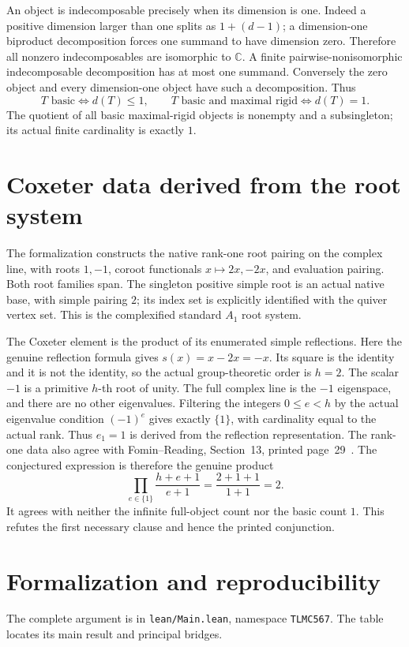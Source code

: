 \documentclass[11pt,a4paper]{article}
\newcommand{\C}{\mathbb C}
\begin{document}
An object is indecomposable precisely when its dimension is one. Indeed a
positive dimension larger than one splits as $1+(d-1)$; a dimension-one
biproduct decomposition forces one summand to have dimension zero.
Therefore all nonzero indecomposables are isomorphic to $\C$. A finite
pairwise-nonisomorphic indecomposable decomposition has at most one summand.
Conversely the zero object and every dimension-one object have such a
decomposition. Thus
\[
 T\text{ basic}\Longleftrightarrow d(T)\le1,
 \qquad T\text{ basic and maximal rigid}\Longleftrightarrow d(T)=1.
\]
The quotient of all basic maximal-rigid objects is nonempty and a subsingleton;
its actual finite cardinality is exactly $1$.

\section*{Coxeter data derived from the root system}
The formalization constructs the native rank-one root pairing on the complex
line, with roots $1,-1$, coroot functionals $x\mapsto2x,-2x$, and evaluation
pairing. Both root families span. The singleton positive simple root is an
actual native base, with simple pairing $2$; its index set is explicitly
identified with the quiver vertex set. This is the complexified standard
$A_1$ root system.

\newpage
The Coxeter element is the product of its enumerated simple reflections. Here
the genuine reflection formula gives $s(x)=x-2x=-x$. Its square is the identity
and it is not the identity, so the actual group-theoretic order is $h=2$.
The scalar $-1$ is a primitive $h$-th root of unity. The full complex line is
the $-1$ eigenspace, and there are no other eigenvalues. Filtering the integers
$0\le e<h$ by the actual eigenvalue condition $(-1)^e$ gives exactly $\{1\}$,
with cardinality equal to the actual rank. Thus $e_1=1$ is derived from the
reflection representation. The rank-one data also agree with
Fomin--Reading, Section~13, printed page~29~\cite{fr}.
The conjectured expression is therefore the genuine product
\[
   \prod_{e\in\{1\}}\frac{h+e+1}{e+1}
       =\frac{2+1+1}{1+1}=2.
\]
It agrees with neither the infinite full-object count nor the basic count $1$.
This refutes the first necessary clause and hence the printed conjunction.

\section*{Formalization and reproducibility}
The complete argument is in \texttt{lean/Main.lean}, namespace
\texttt{TLMC567}. The table locates its main result and principal bridges.
\end{document}
